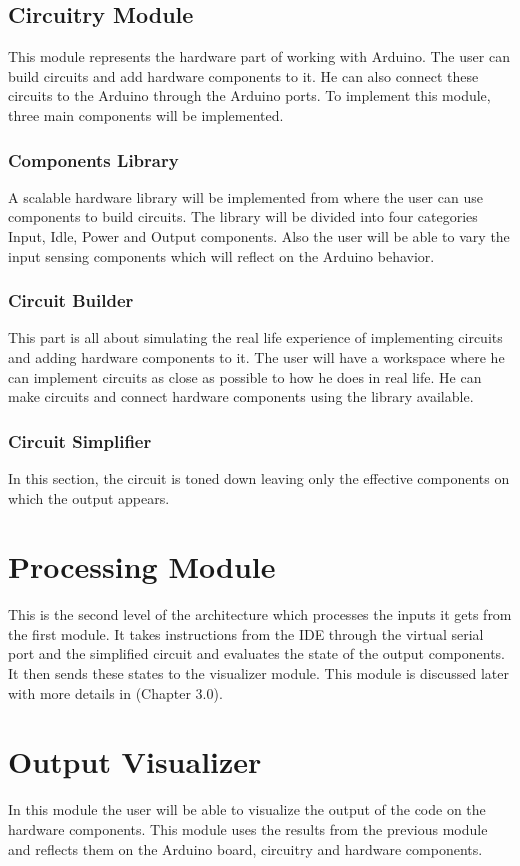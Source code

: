 \documentclass[12pt, a4paper]{report}
\begin{document}
\subsection{Circuitry Module}
This module represents the hardware part of working with Arduino. The user can build circuits and add hardware components to it. He can also connect these circuits to the Arduino through the Arduino ports. To implement this module, three main components will be implemented.
\subsubsection{Components Library}
A scalable hardware library will be implemented from where the user can use components to build circuits. The library will be divided into four categories Input, Idle, Power and Output components. Also the user will be able to vary the input sensing components which will reflect on the Arduino behavior.
\subsubsection{Circuit Builder}
This part is all about simulating the real life experience of implementing circuits and adding hardware components to it. The user will have a workspace where he can implement circuits as close as possible to how he does in real life. He can make circuits and connect hardware components using the library available.
\subsubsection{Circuit Simplifier}
In this section, the circuit is toned down leaving only the effective components on which the output appears.
\section{Processing Module}
This is the second level of the architecture which processes the inputs it gets from the first module. It takes instructions from the IDE through the virtual serial port and the simplified circuit and evaluates the state of the output components. It then sends these states to the visualizer module. This module is discussed later with more details in (Chapter 3.0).
\newpage
\section{Output Visualizer}
In this module the user will be able to visualize the output of the code on the hardware components. This module uses the results from the previous module and reflects them on the Arduino board, circuitry and hardware components.
\end{document}
